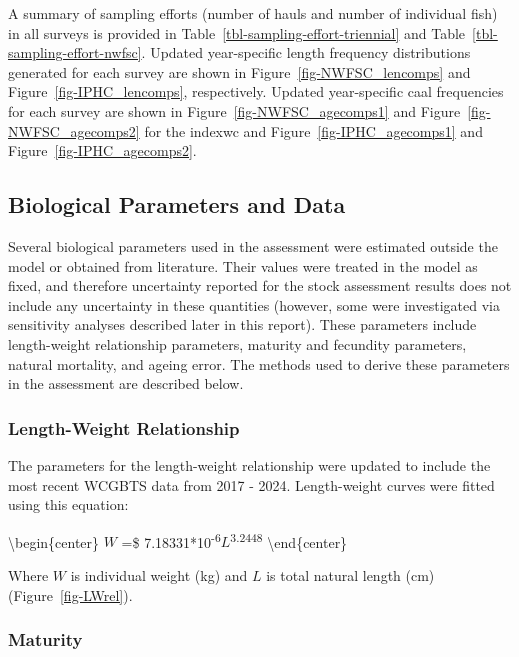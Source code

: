 \documentclass[
]{scrartcl}
\begin{document}
A summary of sampling efforts (number of hauls and number of individual
fish) in all surveys is provided in
Table~\ref{tbl-sampling-effort-triennial} and
Table~\ref{tbl-sampling-effort-nwfsc}. Updated year-specific length
frequency distributions generated for each survey are shown in
Figure~\ref{fig-NWFSC_lencomps} and Figure~\ref{fig-IPHC_lencomps},
respectively. Updated year-specific \gls{caal} frequencies for each
survey are shown in Figure~\ref{fig-NWFSC_agecomps1} and
Figure~\ref{fig-NWFSC_agecomps2} for the \gls{indexwc} and
Figure~\ref{fig-IPHC_agecomps1} and Figure~\ref{fig-IPHC_agecomps2}.

\subsection{Biological Parameters and
Data}\label{biological-parameters-and-data}

Several biological parameters used in the assessment were estimated
outside the model or obtained from literature. Their values were treated
in the model as fixed, and therefore uncertainty reported for the stock
assessment results does not include any uncertainty in these quantities
(however, some were investigated via sensitivity analyses described
later in this report). These parameters include length-weight
relationship parameters, maturity and fecundity parameters, natural
mortality, and ageing error. The methods used to derive these parameters
in the assessment are described below.

\subsubsection{Length-Weight
Relationship}\label{length-weight-relationship}

The parameters for the length-weight relationship were updated to
include the most recent WCGBTS data from 2017 - 2024. Length-weight
curves were fitted using this equation:

\textbackslash begin\{center\} \(W\) =\$
7.18331*10\textsuperscript{-6}\(L\)\textsuperscript{3.2448}
\textbackslash end\{center\}

Where \(W\) is individual weight (kg) and \(L\) is total natural length
(cm) (Figure~\ref{fig-LWrel}).

\subsubsection{Maturity}\label{maturity}
\end{document}
